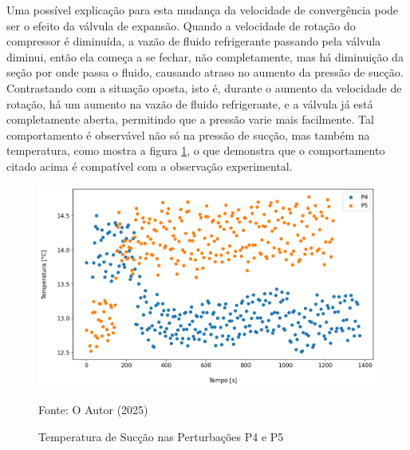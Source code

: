Uma possível explicação para esta mudança da velocidade de convergência pode ser o efeito da válvula de expansão. Quando a velocidade de rotação do compressor é diminuída, a vazão de fluido refrigerante passando pela válvula diminui, então ela começa a se fechar, não completamente, mas há diminuição da seção por onde passa o fluido, causando atraso no aumento da pressão de sucção. Contrastando com a situação oposta, isto é, durante o aumento da velocidade de rotação, há um aumento na vazão de fluido refrigerante, e a válvula já está completamente aberta, permitindo que a pressão varie mais facilmente. Tal comportamento é observável não só na pressão de sucção, mas também na temperatura, como mostra a figura \ref{fig:TempSucçãoSubidaeDescida}, o que demonstra que o comportamento citado acima é compatível com a observação experimental.
\newpage
\begin{figure}[h]
    \centering
    \includegraphics[width=1\linewidth]{FigurasdoTexto/Temperatura de Sucção.png}
    \caption{Temperatura de Sucção  nas Perturbações P4 e P5}
    \label{fig:TempSucçãoSubidaeDescida}
    {\footnotesize Fonte: O Autor (2025)}
\end{figure}

